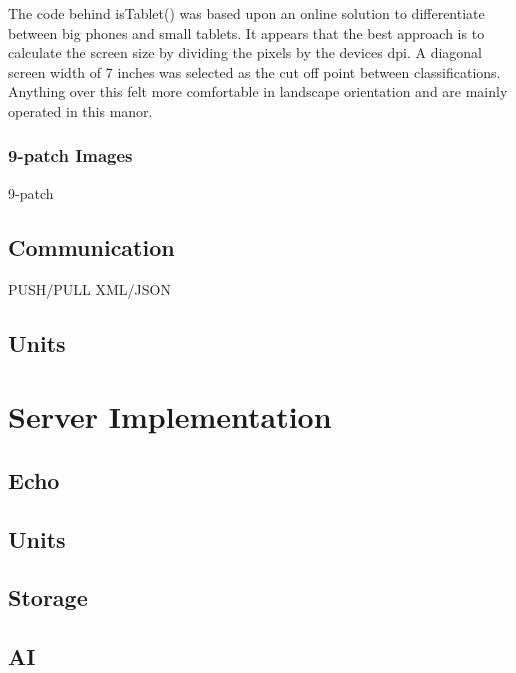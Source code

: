 The code behind isTablet() was based upon an online solution\cite{istablet} to differentiate between big phones and small tablets. It appears that the best approach is to calculate the screen size by dividing the pixels by the devices dpi. A diagonal screen width of 7 inches was selected as the cut off point between classifications. Anything over this felt more comfortable in landscape orientation and are mainly operated in this manor.

\subsubsection*{9-patch Images}
9-patch


\subsection{Communication}
PUSH/PULL
XML/JSON

\subsection{Units}



\section{Server Implementation}

\subsection{Echo}

\subsection{Units}

\subsection{Storage}

\subsection{AI}
